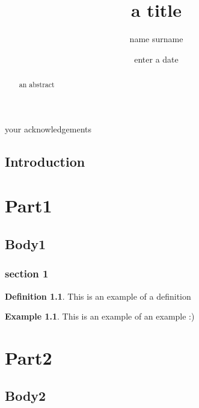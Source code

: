 \documentclass[12pt, a4paper]{report}
\theoremstyle{definition}
\newtheorem{definition}{Definition}[section]
\theoremstyle{definition}%
\newtheorem{example}{Example}[section]
\theoremstyle{definition}%
\theoremstyle{definition}%
\theoremstyle{definition}%
\theoremstyle{definition}%
\begin{document}
\title{a title}
\author{name surname}
\date{enter a date}

\frontmatter


\begin{acknowledgements}
your acknowledgements
\end{acknowledgements}
       
\begin{abstract}
an abstract
\end{abstract}

\tableofcontents

\listoffigures

\listoftables



\mainmatter

\chapter{Introduction}
\part{Part1}
\chapter{Body1}

\section{section 1}

\begin{definition}
This is an example of a definition
\end{definition}

\begin{example}
This is an example of an example :)
\end{example}




\part{Part2}
\chapter{Body2}
\end{document}
